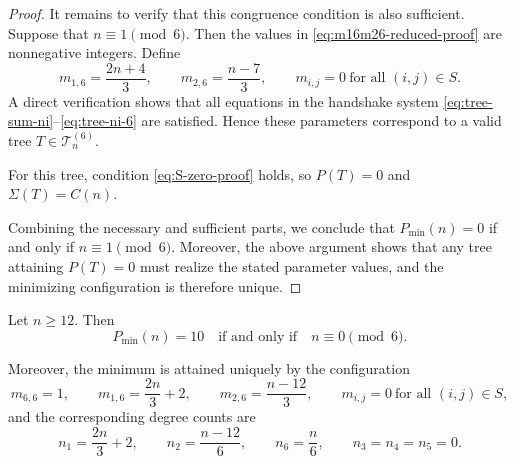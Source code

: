 \documentclass[preprint,12pt]{elsarticle}
\begin{document}
\begin{proof}
\medskip
It remains to verify that this congruence condition is also sufficient.
Suppose that $n\equiv 1\pmod 6$.
Then the values in \eqref{eq:m16m26-reduced-proof} are nonnegative integers.
Define
\[
m_{1,6}=\frac{2n+4}{3},\qquad
m_{2,6}=\frac{n-7}{3},\qquad
m_{i,j}=0\ \text{for all }(i,j)\in S.
\]
A direct verification shows that all equations in the handshake system
\eqref{eq:tree-sum-ni}--\eqref{eq:tree-ni-6} are satisfied.
Hence these parameters correspond to a valid tree
$T\in\mathcal{T}_n^{( 6)}$.

For this tree, condition \eqref{eq:S-zero-proof} holds, so $P(T)=0$ and
$\Sigma(T)=C(n)$.

\medskip
Combining the necessary and sufficient parts, we conclude that
$P_{\min}(n)=0$ if and only if $n\equiv 1\pmod 6$.
Moreover, the above argument shows that any tree attaining $P(T)=0$
must realize the stated parameter values, and the minimizing configuration
is therefore unique.
\end{proof}


\begin{theorem}
\label{thm:delta6-P10}
Let $n\ge 12$.
Then
\[
P_{\min}(n)=10
\quad\text{if and only if}\quad
n\equiv 0 \pmod 6.
\]

Moreover, the minimum is attained uniquely by the configuration
\[
m_{6,6}=1,\qquad
m_{1,6}=\frac{2n}{3}+2,\qquad
m_{2,6}=\frac{n-12}{3},
\qquad
m_{i,j}=0\ \text{for all }(i,j)\in S,
\]
and the corresponding degree counts are
\[
n_1=\frac{2n}{3}+2,\qquad
n_2=\frac{n-12}{6},\qquad
n_6=\frac{n}{6},\qquad
n_3=n_4=n_5=0.
\]
\end{theorem}
\end{document}
